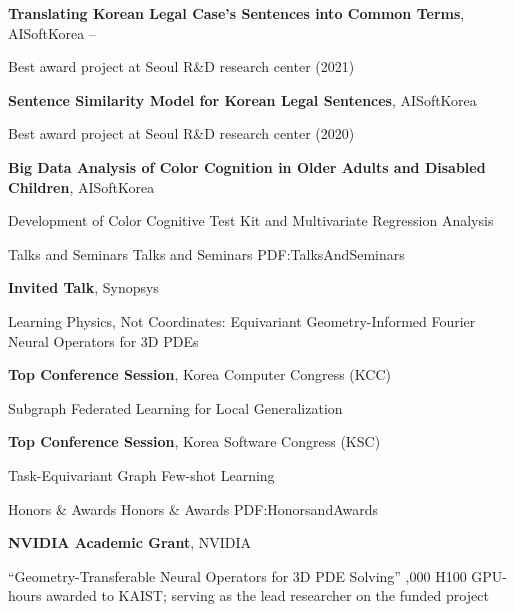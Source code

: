\documentclass[letterpaper,MMMyyyy,nonstopmode]{simpleresumecv}
\begin{document}
\begin{Body}
\Gap
\BulletItem
\textbf{Translating Korean Legal Case’s Sentences into Common Terms}, AISoftKorea
\hfill
{}--
\begin{Detail}
\Item
Best award project at Seoul R\&D research center (2021)
\end{Detail}

\Gap
\BulletItem
\textbf{Sentence Similarity Model for Korean Legal Sentences}, AISoftKorea
\hfill
{}
\begin{Detail}
\Item
Best award project at Seoul R\&D research center (2020)
\end{Detail}

\Gap
\BulletItem
\textbf{Big Data Analysis of Color Cognition in Older Adults and Disabled Children}, AISoftKorea
\hfill
{}
\begin{Detail}
\Item
Development of Color Cognitive Test Kit and Multivariate Regression Analysis 
\end{Detail}

\Section
{Talks and Seminars}
{Talks and Seminars}
{PDF:TalksAndSeminars}

\BulletItem
\textbf{Invited Talk}, Synopsys
\hfill
{}
\begin{Detail}
\Item
Learning Physics, Not Coordinates: Equivariant Geometry-Informed Fourier Neural Operators for 3D PDEs
\end{Detail}

\Gap
\BulletItem
\textbf{Top Conference Session}, Korea Computer Congress (KCC)
\hfill
{}
\begin{Detail}
\Item
Subgraph Federated Learning for Local Generalization
\end{Detail}

\Gap
\BulletItem
\textbf{Top Conference Session}, Korea Software Congress (KSC)
\hfill
{}
\begin{Detail}
\Item
Task-Equivariant Graph Few-shot Learning
\end{Detail}



\Section
{Honors \&\newline
Awards}
{Honors \& Awards}
{PDF:HonorsandAwards}

\Gap
\BulletItem
\textbf{NVIDIA Academic Grant}, NVIDIA
\hfill
{}
\begin{Detail}
\Item
``Geometry-Transferable Neural Operators for 3D PDE Solving''
,000 H100 GPU-hours awarded to KAIST; serving as the lead researcher on the funded project
\end{Detail}


\end{Body}
\end{document}
